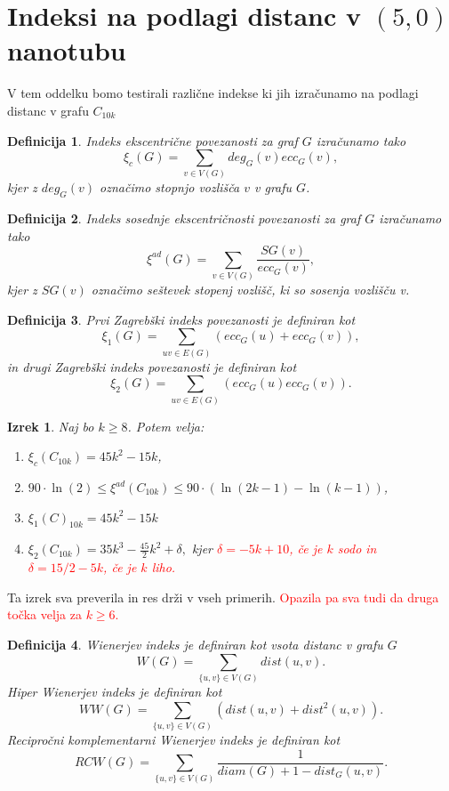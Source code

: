 \documentclass[a4paper, 12pt]{article}
\newtheorem{izrek}{Izrek}[section]
\newtheorem{definicija}{Definicija}[section]
\begin{document}
\section{Indeksi na podlagi distanc v $(5,0)$ nanotubu}

V tem oddelku bomo testirali različne indekse ki jih izračunamo na podlagi distanc v grafu $C_{10k}$

\begin{definicija}
    Indeks ekscentrične povezanosti za graf $G$ izračunamo tako
    $$
    \xi_{c}(G) = \sum_{v \in V(G)}deg_G(v)ecc_G(v),
    $$
    kjer z $deg_G(v)$ označimo stopnjo vozlišča $v$ v grafu $G$.
\end{definicija}

\begin{definicija}
    Indeks sosednje ekscentričnosti povezanosti za graf $G$ izračunamo tako
    $$
    \xi^{ad}(G) = \sum_{v \in V(G)}\frac{SG(v)}{ecc_G(v)},
    $$
    kjer z $SG(v)$ označimo seštevek stopenj vozlišč, ki so sosenja vozlišču v.
\end{definicija}

\begin{definicija}
    Prvi Zagrebški indeks povezanosti je definiran kot
    $$
    \xi_{1}(G) = \sum_{uv \in E(G)}(ecc_G(u) + ecc_G(v)),
    $$
    in drugi Zagrebški indeks povezanosti je definiran kot
    $$
    \xi_{2}(G) = \sum_{uv \in E(G)}(ecc_G(u)ecc_G(v)).
    $$
\end{definicija}

\begin{izrek}
    Naj bo $k \geq 8$. Potem velja:
    \begin{enumerate}
        \item $\xi_{c}(C_{10k}) = 45k^2 - 15k$,
        \item $90 \cdot \ln(2) \leq \xi^{ad}(C_{10k}) \leq 90 \cdot (\ln(2k - 1) - \ln(k - 1))$,
        \item $\xi_{1}(C)_{10k} = 45k^2 - 15k$
        \item $\xi_{2}(C_{10k}) = 35k^3 - \frac{45}{2}k^2 + \delta,$ kjer \textcolor{red}{$\delta = -5k + 10$, če je $k$ sodo in $\delta = 15 / 2 - 5 k$, če je $k$ liho.} 
    \end{enumerate}
\end{izrek}

Ta izrek sva preverila in res drži v vseh primerih. \textcolor{red}{Opazila pa sva tudi da druga točka velja za $k \geq 6$.}

\begin{definicija}
    Wienerjev indeks je definiran kot vsota distanc v grafu $G$
    $$
    W(G) = \sum_{\{u,v\}\in V(G)}dist(u,v).
    $$
    Hiper Wienerjev indeks je definiran kot
    $$
    WW(G) = \sum_{\{u,v\}\in V(G)} (dist(u,v) + dist^2(u,v)).
    $$
    Recipročni komplementarni Wienerjev indeks je definiran kot
    $$
    RCW(G) = \sum_{\{u,v\}\in V(G)} \frac{1}{diam(G) + 1 - dist_G(u,v)}.
    $$
\end{definicija}
\end{document}
